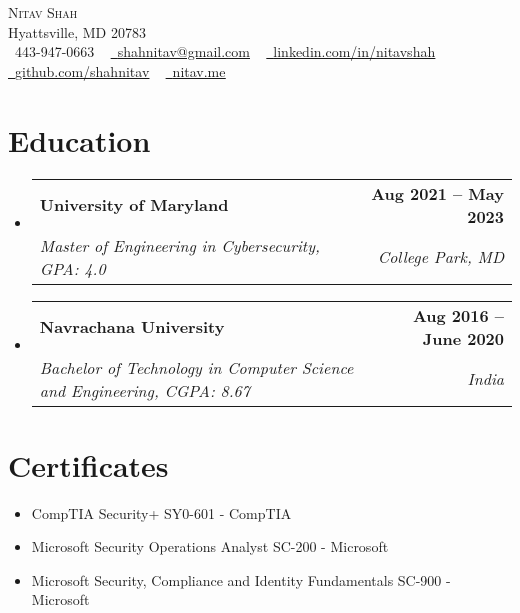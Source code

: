 \documentclass[letterpaper,11pt]{article}
\makeatletter
\newcommand{\resumeSubheading}[4]{
  \vspace{-2pt}\item
    \begin{tabular*}{1.0\textwidth}[t]{l@{\extracolsep{\fill}}r}
      \textbf{#1} & \textbf{\small #2} \\
      \textit{\small#3} & \textit{\small #4} \\
    \end{tabular*}\vspace{-7pt}
}
\newcommand{\resumeSubHeadingListStart}{\begin{itemize}[leftmargin=0.0in, label={}]}
\newcommand{\resumeSubHeadingListEnd}{\end{itemize}}
\makeatother
\begin{document}
\begin{center}
    {\Huge \scshape Nitav Shah} \\ \vspace{1pt}
    Hyattsville, MD 20783 \\ \vspace{1pt}
    \small \raisebox{-0.1\height}\faPhone\ 443-947-0663 ~ \href{mailto:shahnitav@gmail.com}{\raisebox{-0.2\height}\faEnvelope\  \underline{shahnitav@gmail.com}} ~ 
    \href{https://linkedin.com/in/nitavshah/}{\raisebox{-0.2\height}\faLinkedin\ \underline{linkedin.com/in/nitavshah}}  ~
    \href{https://github.com/shahnitav}{\raisebox{-0.2\height}\faGithub\ \underline{github.com/shahnitav}}  ~
    \href{https://nitav.me}{\raisebox{-0.2\height}\faGlobe\
    \underline{nitav.me}}
    \vspace{-8pt}
\end{center}


\section{Education}
  \resumeSubHeadingListStart
    \resumeSubheading
      {University of Maryland}{Aug 2021 -- May 2023}
      {Master of Engineering in Cybersecurity, GPA: 4.0}{College Park, MD}
  \resumeSubHeadingListEnd
  \resumeSubHeadingListStart
    \resumeSubheading
      {Navrachana University}{Aug 2016 -- June 2020}
      {Bachelor of Technology in Computer Science and Engineering, CGPA: 8.67}{India}
  \resumeSubHeadingListEnd
  
\section{Certificates}
        \begin{itemize}
            \item CompTIA Security+ SY0-601 - CompTIA
            \vspace{-0.8em} \item Microsoft Security Operations Analyst SC-200 - Microsoft
            \vspace{-0.8em} \item Microsoft Security, Compliance and Identity Fundamentals SC-900 - Microsoft 
        \end{itemize}
\vspace{-16pt}

\end{document}
